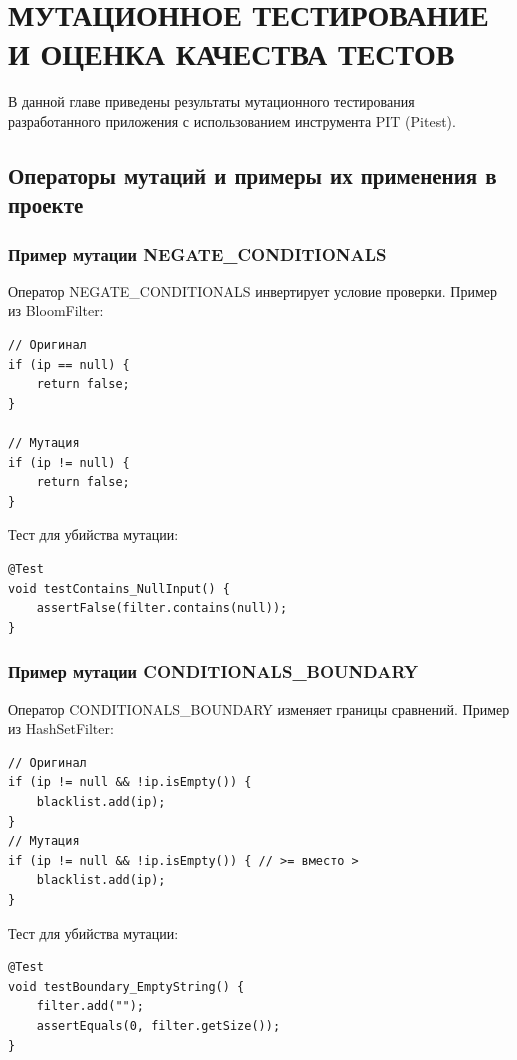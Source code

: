 \chapter{МУТАЦИОННОЕ ТЕСТИРОВАНИЕ И ОЦЕНКА КАЧЕСТВА ТЕСТОВ} \label{ch4}

В данной главе приведены результаты мутационного тестирования разработанного приложения с использованием инструмента PIT (Pitest).

\section{Операторы мутаций и примеры их применения в проекте}\label{ch4:sec1}
\subsection{Пример мутации NEGATE\_CONDITIONALS}
Оператор NEGATE\_CONDITIONALS инвертирует условие проверки. 
Пример из BloomFilter:
\begin{verbatim}
// Оригинал
if (ip == null) {
    return false;
}

// Мутация
if (ip != null) {
    return false;
}
\end{verbatim}

Тест для убийства мутации:
\begin{verbatim}
@Test
void testContains_NullInput() {
    assertFalse(filter.contains(null));
}
\end{verbatim}

\subsection{Пример мутации CONDITIONALS\_BOUNDARY}
Оператор CONDITIONALS\_BOUNDARY изменяет границы сравнений. Пример из HashSetFilter:
\begin{verbatim}
// Оригинал
if (ip != null && !ip.isEmpty()) {
    blacklist.add(ip);
}
// Мутация
if (ip != null && !ip.isEmpty()) { // >= вместо >
    blacklist.add(ip);
}
\end{verbatim}

Тест для убийства мутации:
\begin{verbatim}
@Test
void testBoundary_EmptyString() {
    filter.add("");
    assertEquals(0, filter.getSize());
}
\end{verbatim}

